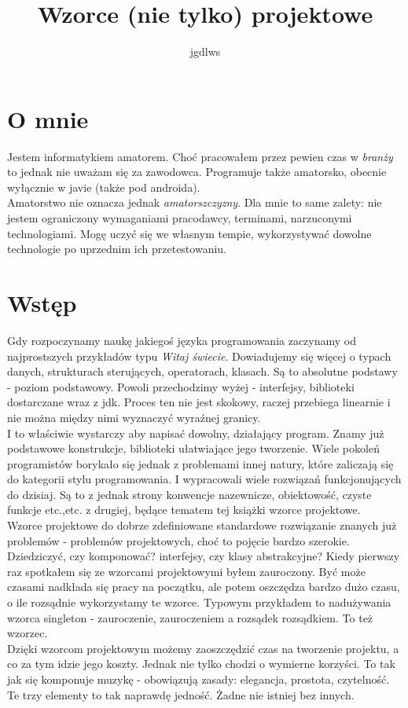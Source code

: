 \documentclass[12pt,a4paper]{article}
\author{jgdlws}
\title{Wzorce (nie tylko) projektowe}
\begin{document}
	\part*{O mnie}
	Jestem informatykiem amatorem. Choć pracowałem przez pewien czas w \emph{branży} to jednak nie uważam się za zawodowca. Programuje także amatorsko, obecnie wyłącznie w javie (także pod androida). \\
	Amatorstwo nie oznacza jednak \emph{amatorszczyzny}. Dla mnie to same zalety: nie jestem ograniczony wymaganiami pracodawcy, terminami, narzuconymi technologiami. Mogę uczyć się we własnym tempie, wykorzystywać dowolne technologie po uprzednim ich przetestowaniu.
	\part*{Wstęp}
	Gdy rozpoczynamy naukę jakiegoś języka programowania zaczynamy od najprostszych przykładów typu \emph{Witaj świecie}. Dowiadujemy się więcej o typach danych, strukturach sterujących, operatorach, klasach. Są to absolutne podstawy - poziom podstawowy. Powoli przechodzimy wyżej - interfejsy, biblioteki dostarczane wraz z jdk. Proces ten nie jest skokowy, raczej przebiega linearnie i nie można między nimi wyznaczyć wyraźnej granicy.\\
	I to właściwie wystarczy aby napisać dowolny, działający program. Znamy już podstawowe konstrukcje, biblioteki ułatwiające jego tworzenie. Wiele pokoleń programistów borykało się jednak z problemami innej natury, które zaliczają się do kategorii stylu programowania. I wypracowali  wiele rozwiązań funkcjonujących do dzisiaj. Są to z jednak strony konwencje nazewnicze, obiektowość, czyste funkcje etc.,etc. z drugiej, będące tematem tej książki wzorce projektowe. \\
	Wzorce projektowe do dobrze zdefiniowane standardowe rozwiązanie  znanych już problemów - problemów projektowych, choć to pojęcie bardzo szerokie. Dziedziczyć, czy komponować? interfejsy, czy klasy abstrakcyjne? Kiedy pierwszy raz spotkałem się ze wzorcami projektowymi byłem zauroczony. Być może czasami nadkłada się pracy na początku, ale potem oszczędza bardzo dużo czasu, o ile rozsądnie wykorzystamy te wzorce. Typowym przykładem to nadużywania wzorca singleton - zauroczenie, zauroczeniem a rozsądek rozsądkiem. To też wzorzec.\\
	Dzięki wzorcom projektowym możemy zaoszczędzić czas na tworzenie projektu, a co za tym idzie jego koszty. Jednak nie tylko chodzi o wymierne korzyści. To tak jak się komponuje muzykę - obowiązują zasady: elegancja, prostota, czytelność. Te trzy elementy to tak naprawdę jedność. Żadne nie istniej bez innych.\\
\end{document}
